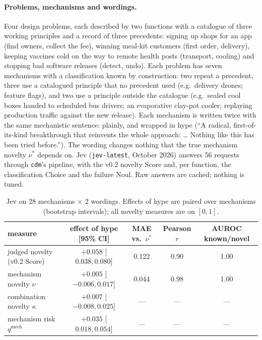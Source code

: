 \documentclass[11pt]{article}
\theoremstyle{definition}
\begin{document}
\paragraph{Problems, mechanisms and wordings.} Four design problems, each described by two functions with a catalogue of three
working principles and a record of three precedents: signing up shops for an app (find owners,
collect the fee), winning meal-kit customers (first order, delivery), keeping vaccines cold on the
way to remote health posts (transport, cooling) and stopping bad software releases (detect,
undo). Each problem has seven mechanisms with a classification known by construction: two repeat
a precedent, three use a catalogued principle that no precedent used (e.g.\ delivery drones;
feature flags), and two use a principle outside the catalogue (e.g.\ sealed cool boxes handed to
scheduled bus drivers; an evaporative clay-pot cooler; replaying production traffic against the
new release). Each mechanism is written twice with the same mechanistic sentence: plainly, and
wrapped in hype (``A radical, first-of-its-kind breakthrough that reinvents the whole approach:
\ldots{} Nothing like this has been tried before.''). The wording changes nothing that the true
mechanism novelty $\nu^\ast$ depends on. Jev (\texttt{jev-latest}, October 2026) answers 56
requests through \texttt{cdm}'s pipeline, with the v0.2 novelty Score and, per function, the
classification Choice and the failure Noul. Raw answers are cached; nothing is tuned.

\begin{table}[h]
\centering\small
\begin{tabular}{@{}lcccc@{}}
\toprule
measure & effect of hype [95\% CI] & MAE vs.\ $\nu^\ast$ & Pearson $r$ & AUROC known/novel \\
\midrule
judged novelty (v0.2 Score) & $+0.058$ [$0.038,0.080$] & 0.122 & 0.90 & 1.00 \\
mechanism novelty $\nu$ & $+0.005$ [$-0.006,0.017$] & 0.044 & 0.98 & 1.00 \\
combination novelty $\kappa$ & $+0.007$ [$-0.008,0.025$] & --- & --- & --- \\
mechanism risk $q^{\mathrm{mech}}$ & $+0.035$ [$0.018,0.054$] & --- & --- & --- \\
\bottomrule
\end{tabular}
\caption{Jev on 28 mechanisms $\times$ 2 wordings. Effects of hype are paired over mechanisms
(bootstrap intervals); all novelty measures are on $[0,1]$.}
\label{tab:mechjev}
\end{table}
\end{document}
